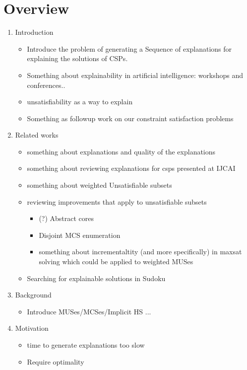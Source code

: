 \documentclass[twoside,11pt]{article}
\begin{document}
\section*{Overview}
\begin{enumerate}
\item Introduction
	  \begin{itemize}
		  \item Introduce the problem of generating a Sequence of explanations for explaining the solutions of CSPs.
		  \item Something about explainability in artificial intelligence: workshops and conferences..
		  \item unsatisfiability as a way to explain
		  \item Something as followup work on our constraint satisfaction problems
	  \end{itemize}
\item Related works
	  \begin{itemize}
		  \item something about explanations and quality of the explanations 
		  \item something about reviewing explanations for csps presented at IJCAI
		  \item something about weighted Unsatisfiable subsets
		  \item reviewing improvements that apply to unsatisfiable subsets
				\begin{itemize}
					\item  (?) Abstract cores
					\item  Disjoint MCS enumeration
					\item  something about incrementaltity (and more specifically) in maxsat solving which could be applied to weighted MUSes
				\end{itemize}
		  \item Searching for explainable solutions in Sudoku 
	  \end{itemize}
\item Background
	  \begin{itemize}
		  \item Introduce MUSes/MCSes/Implicit HS ...
	  \end{itemize}
\item Motivation
	  \begin{itemize}
		  \item time to generate explanations too slow
		  \item Require optimality

\end{itemize}
\end{enumerate}
\end{document}

